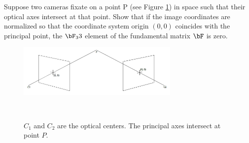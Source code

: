 \begin{problem}
  Suppose two cameras fixate on a point P (see Figure \ref{fig:1}) in space such that
  their optical axes intersect at that point.
  Show that if the image coordinates are normalized so that the
  coordinate system origin $(0, 0)$ coincides with the principal point,
  the $\bF_33$ element of the fundamental matrix $\bF$ is zero.

  \begin{figure}[H]
    \includegraphics[width=0.7\textwidth]{figures/rectified-pair}
    \caption{$C_1$ and $C_2$ are the optical centers.  The principal axes intersect at point $P$.}
    ~\label{fig:1}
  \end{figure}
\end{problem}

\begin{answer}
  
\end{answer}
